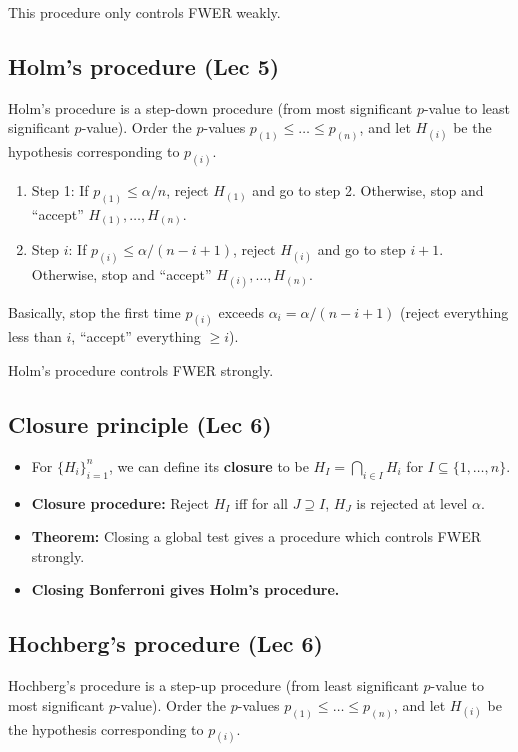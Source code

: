 \documentclass[twoside]{article}
\newcommand\dis{\displaystyle}
\begin{document}
This procedure only controls FWER weakly.

\subsection{Holm's procedure (Lec 5)}
Holm's procedure is a step-down procedure (from most significant $p$-value to least significant $p$-value). Order the $p$-values $p_{(1)} \leq \dots \leq p_{(n)}$, and let $H_{(i)}$ be the hypothesis corresponding to $p_{(i)}$.
\begin{enumerate}
\item Step 1: If $p_{(1)} \leq \alpha /n$, reject $H_{(1)}$ and go to step 2. Otherwise, stop and ``accept'' $H_{(1)}, \dots, H_{(n)}$.
\item Step $i$: If $p_{(i)} \leq \alpha /(n-i+1)$, reject $H_{(i)}$ and go to step $i+1$. Otherwise, stop and ``accept'' $H_{(i)}, \dots, H_{(n)}$.
\end{enumerate}

Basically, stop the first time $p_{(i)}$ exceeds $\alpha_i = \alpha / (n-i+1)$ (reject everything less than $i$, ``accept'' everything $\geq i$).

Holm's procedure controls FWER strongly.

\subsection{Closure principle (Lec 6)}
\begin{itemize}
\item For $\{ H_i\}_{i=1}^n$, we can define its \textbf{closure} to be $H_I = \dis\bigcap_{i \in I} H_i$ for $I \subseteq \{ 1, \dots, n\}$.

\item \textbf{Closure procedure:} Reject $H_I$ iff for all $J \supseteq I$, $H_J$ is rejected at level $\alpha$.

\item \textbf{Theorem:} Closing a global test gives a procedure which controls FWER strongly.

\item \textbf{Closing Bonferroni gives Holm's procedure.}
\end{itemize}

\subsection{Hochberg's procedure (Lec 6)}
Hochberg's procedure is a step-up procedure (from least significant $p$-value to most significant $p$-value). Order the $p$-values $p_{(1)} \leq \dots \leq p_{(n)}$, and let $H_{(i)}$ be the hypothesis corresponding to $p_{(i)}$.
\end{document}
